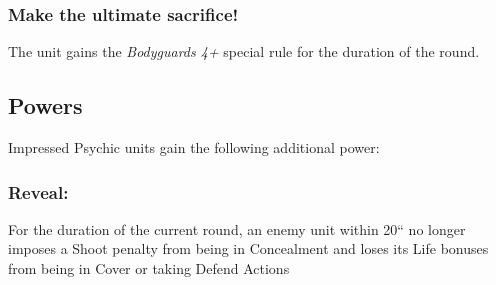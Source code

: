 \subsubsection*{Make the ultimate sacrifice!} The unit gains the \textit{Bodyguards 4+} special rule for the duration of the round.


\subsection*{Powers}

Impressed Psychic units gain the following additional power:

\subsubsection*{Reveal:} For the duration of the current round, an enemy unit within 20`` no longer imposes a Shoot penalty from being in Concealment and loses its Life bonuses from being in Cover or taking Defend Actions


\pagebreak



